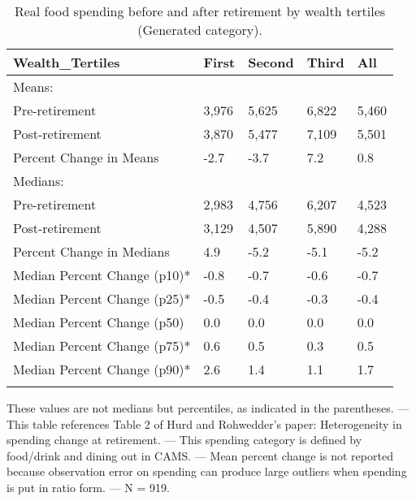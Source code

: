 \begin{table}[tbp] \centering
{}

\caption{Real food spending before and after retirement by wealth tertiles (Generated category).}
\begin{tabularx}{\textwidth}{lCCCC}

\toprule
{Wealth\_Tertiles}&{First}&{Second}&{Third}&{All} \tabularnewline
\midrule\addlinespace[1.5ex]
Means:&&&& \tabularnewline
\midrule Pre-retirement&3,976&5,625&6,822&5,460 \tabularnewline
Post-retirement&3,870&5,477&7,109&5,501 \tabularnewline
Percent Change in Means&-2.7&-3.7&7.2&0.8 \tabularnewline
\midrule Medians:&&&& \tabularnewline
\midrule Pre-retirement&2,983&4,756&6,207&4,523 \tabularnewline
Post-retirement&3,129&4,507&5,890&4,288 \tabularnewline
Percent Change in Medians&4.9&-5.2&-5.1&-5.2 \tabularnewline
Median Percent Change (p10)*&-0.8&-0.7&-0.6&-0.7 \tabularnewline
Median Percent Change (p25)*&-0.5&-0.4&-0.3&-0.4 \tabularnewline
Median Percent Change (p50)&0.0&0.0&0.0&0.0 \tabularnewline
Median Percent Change (p75)*&0.6&0.5&0.3&0.5 \tabularnewline
Median Percent Change (p90)*&2.6&1.4&1.1&1.7 \tabularnewline
\bottomrule \addlinespace[1.5ex]

\end{tabularx}
\begin{flushleft}
\footnotesize *These values are not medians but percentiles, as indicated in the parentheses. \linebreak --- \linebreak This table references Table 2 of Hurd and Rohwedder's paper: Heterogeneity in spending change at retirement. \linebreak --- \linebreak This spending category is defined by food/drink and dining out in CAMS. \linebreak --- \linebreak Mean percent change is not reported because observation error on spending can produce large outliers when spending is put in ratio form. \linebreak --- \linebreak N = 919.
\end{flushleft}
\end{table}
